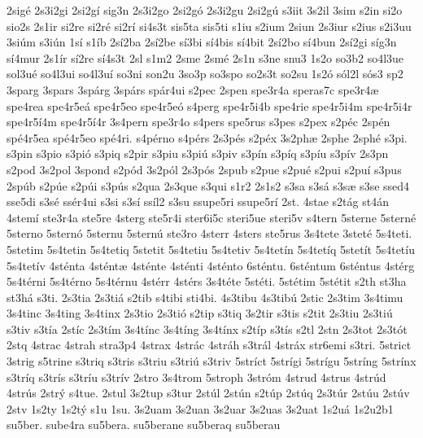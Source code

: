 {2sig^^e9
2s3i2gi
2si2g^^ed
sig3n
2s3i2go
2si2g^^f3
2s3i2gu
2si2g^^fa
s3iit
3s2il
3sim
s2in
si2o
sio2s
2s1ir
si2re
si2r^^e9
si2r^^ed
si4s3t
sis5ta
sis5ti
s1iu
s2ium
2siun
2s3iur
s2ius
s2i3uu
3si^^fam
s3i^^fan
1s^^ed
s1^^edb
2s^^ed2ba
2s^^ed2be
s^^ed3bi
s^^ed4bis
s^^ed4bit
2s^^ed2bo
s^^ed4bun
2s^^ed2gi
s^^edg3n
s^^ed4mur
2s1^^edr
s^^ed2re
s^^ed4s3t
2sl
s1m2
2sme
2sm^^e9
2s1n
s3ne
snu3
1s2o
so3b2
so4l3ue
sol3u^^e9
so4l3ui
so4l3u^^ed
so3ni
son2u
3so3p
so3spo
so2s3t
so2su
1s2^^f3
s^^f3l2l
s^^f3s3
sp2
3sparg
3spars
3sp^^e1rg
3sp^^e1rs
sp^^e1r4ui
s2pec
2spen
spe3r4a
speras7c
spe3r4^^e6
spe4rea
spe4r5e^^e1
spe4r5eo
spe4r5e^^f3
s4perg
spe4r5i4b
spe4rie
spe4r5i4m
spe4r5i4r
spe4r5^^ed4m
spe4r5^^ed4r
3s4pern
spe3r4o
s4pers
spe5rus
s3pes
s2pex
s2p^^e9c
2sp^^e9n
sp^^e94r5ea
sp^^e94r5eo
sp^^e94ri.
s4p^^e9rno
s4p^^e9rs
2s3p^^e9s
s2p^^e9x
3s2ph^^e6
2sphe
2sph^^e9
s3pi.
s3pin
s3pio
s3pi^^f3
s3piq
s2pir
s3piu
s3pi^^fa
s3piv
s3p^^edn
s3p^^edq
s3p^^edu
s3p^^edv
2s3pn
s2pod
3s2pol
3spond
s2p^^f3d
3s2p^^f3l
2s3p^^f3s
2spub
s2pue
s2pu^^e9
s2pui
s2pu^^ed
s3pus
2sp^^fab
s2p^^fae
s2p^^fai
s3p^^fas
s2qua
2s3que
s3qui
s1r2
2s1s2
s3sa
s3s^^e1
s3s^^e6
s3se
ssed4
sse5di
s3s^^e9
ss^^e9r4ui
s3si
s3s^^ed
ss^^edl2
s3su
ssupe5ri
ssupe5r^^ed
2st.
4stae
s2t^^e1g
st4^^e1n
4stem^^ed
ste3r4a
ste5re
4sterg
ste5r4i
ster6i5c
steri5ue
steri5v
s4tern
5sterne
5stern^^e9
5sterno
5stern^^f3
5sternu
5stern^^fa
ste3ro
4sterr
4sters
ste5rus
3s4tete
3stet^^e9
5s4teti.
5stetim
5s4tetin
5s4tetiq
5stetit
5s4tetiu
5s4tetiv
5s4tet^^edn
5s4tet^^edq
5stet^^edt
5s4tet^^edu
5s4tet^^edv
4st^^e9nta
4st^^e9nt^^e6
4st^^e9nte
4st^^e9nti
4st^^e9nto
6st^^e9ntu.
6st^^e9ntum
6st^^e9ntus
4st^^e9rg
5s4t^^e9rni
5s4t^^e9rno
5s4t^^e9rnu
4st^^e9rr
4st^^e9rs
3s4t^^e9te
5st^^e9ti.
5st^^e9tim
5st^^e9tit
s2th
st3ha
st3h^^e1
s3ti.
2s3tia
2s3ti^^e1
s2tib
s4tibi
sti4bi.
4s3tibu
4s3tib^^fa
2stic
2s3tim
3s4timu
3s4tinc
3s4ting
3s4tinx
2s3tio
2s3ti^^f3
s2tip
s3tiq
3s2tir
s3tis
s2tit
2s3tiu
2s3ti^^fa
s3tiv
s3t^^eda
2st^^edc
2s3t^^edm
3s4t^^ednc
3s4t^^edng
3s4t^^ednx
s2t^^edp
s3t^^eds
s2tl
2stn
2s3tot
2s3t^^f3t
2stq
4strac
4strah
stra3p4
4strax
4str^^e1c
4str^^e1h
s3tr^^e1l
4str^^e1x
str6emi
s3tri.
5strict
3strig
s5trine
s3triq
s3tris
s3triu
s3tri^^fa
s3triv
5str^^edct
5str^^edgi
5str^^edgu
5str^^edng
5str^^ednx
s3tr^^edq
s3tr^^eds
s3tr^^edu
s3tr^^edv
2stro
3s4trom
5stroph
3str^^f3m
4strud
4strus
4str^^fad
4str^^fas
2str^^fd
s4tue.
2stul
3s2tup
s3tur
2st^^fal
2st^^fan
s2t^^fap
2st^^faq
2s3t^^far
2st^^fau
2st^^fav
2stv
1s2ty
1s2t^^fd
s1u
1su.
3s2uam
3s2uan
3s2uar
3s2uas
3s2uat
1s2u^^e1
1s2u2b1
su5ber.
sube4ra
su5bera.
su5berane
su5beraq
su5berau
}
